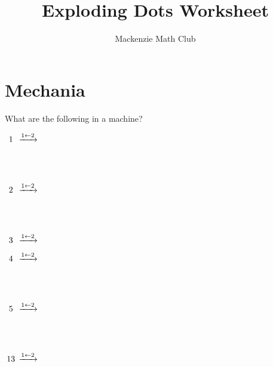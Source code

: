 \documentclass[letterpaper,12pt]{article}
\title{Exploding Dots Worksheet}
\author{Mackenzie Math Club}
\date{}
\begin{document}
	\maketitle
	\section{Mechania}
		What are the following in a  machine?

		\begin{minipage}{0.5\textwidth}
			\begin{minipage}{0.25\textwidth}
				$\mathmakebox[5mm]{1} \xrightarrow{\mach{2}{1}}$
			\end{minipage}
			\begin{minipage}{0.75\textwidth}
			\end{minipage}
			\\\\
			\begin{minipage}{0.25\textwidth}
				$\mathmakebox[5mm]{2} \xrightarrow{\mach{2}{1}}$
			\end{minipage}
			\begin{minipage}{0.75\textwidth}
			\end{minipage}
			\\\\
			\begin{minipage}{0.25\textwidth}
				$\mathmakebox[5mm]{3} \xrightarrow{\mach{2}{1}}$
			\end{minipage}
			\begin{minipage}{0.75\textwidth}
			\end{minipage}
		\end{minipage}
		\begin{minipage}{0.5\textwidth}
			\begin{minipage}{0.25\textwidth}
				$\mathmakebox[5mm]{4} \xrightarrow{\mach{2}{1}}$
			\end{minipage}
			\begin{minipage}{0.75\textwidth}
			\end{minipage}
			\\\\
			\begin{minipage}{0.25\textwidth}
				$\mathmakebox[5mm]{5} \xrightarrow{\mach{2}{1}}$
			\end{minipage}
			\begin{minipage}{0.75\textwidth}
			\end{minipage}
			\\\\
			\begin{minipage}{0.25\textwidth}
				$\mathmakebox[5mm]{13} \xrightarrow{\mach{2}{1}}$
			\end{minipage}
			\begin{minipage}{0.75\textwidth}
			\end{minipage}
		\end{minipage}
\end{document}
